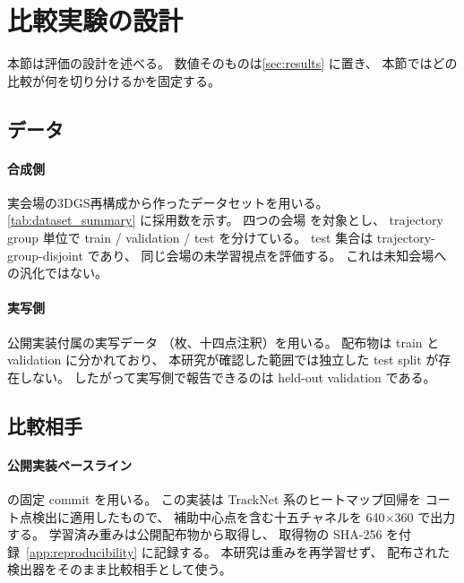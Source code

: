 \section{比較実験の設計}
\label{sec:experiments}

本節は評価の設計を述べる。
数値そのものは\cref{sec:results} に置き、
本節ではどの比較が何を切り分けるかを固定する。

\subsection{データ}
\label{sec:data}

\paragraph{合成側}
実会場の3DGS再構成から作ったデータセットを用いる。
\cref{tab:dataset_summary} に採用数を示す。
四つの会場 \SceneSet を対象とし、
trajectory group 単位で train / validation / test を分けている。
test 集合は trajectory-group-disjoint であり、
同じ会場の未学習視点を評価する。
これは未知会場への汎化ではない。



\paragraph{実写側}
\BaselineName 公開実装付属の実写データ
（\TCDImageCount 枚、十四点注釈）を用いる。
配布物は train と validation に分かれており、
本研究が確認した範囲では独立した test split が存在しない。
したがって実写側で報告できるのは held-out validation である。



\subsection{比較相手}
\label{sec:baselines}

\paragraph{公開実装ベースライン}
\BaselineName\cite{tcdrepo} の固定 commit \BaselineCommit を用いる。
この実装は TrackNet 系のヒートマップ回帰\cite{huang2019tracknet}を
コート点検出に適用したもので、
補助中心点を含む十五チャネルを 640\(\times\)360 で出力する。
学習済み重みは公開配布物から取得し、
取得物の SHA-256 を付録~\ref{app:reproducibility} に記録する。
本研究は重みを再学習せず、
配布された検出器をそのまま比較相手として使う。

